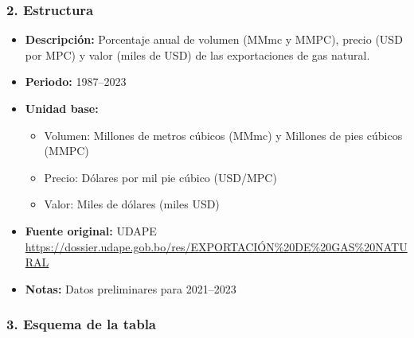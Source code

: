 \documentclass[12pt,a4paper]{article}
\begin{document}
\subsubsection*{2. Estructura}
\begin{itemize}
  \item \textbf{Descripción:} Porcentaje anual de volumen (MMmc y MMPC), precio (USD por MPC) y valor (miles de USD) de las exportaciones de gas natural.
  \item \textbf{Periodo:} 1987--2023
  \item \textbf{Unidad base:}
    \begin{itemize}
      \item Volumen: Millones de metros cúbicos (MMmc) y Millones de pies cúbicos (MMPC)
      \item Precio: Dólares por mil pie cúbico (USD/MPC)
      \item Valor: Miles de dólares (miles USD)
    \end{itemize}
  \item \textbf{Fuente original:} UDAPE \url{https://dossier.udape.gob.bo/res/EXPORTACIÓN%20DE%20GAS%20NATURAL}
  \item \textbf{Notas:} Datos preliminares para 2021–2023
\end{itemize}

\subsubsection*{3. Esquema de la tabla}
\end{document}
